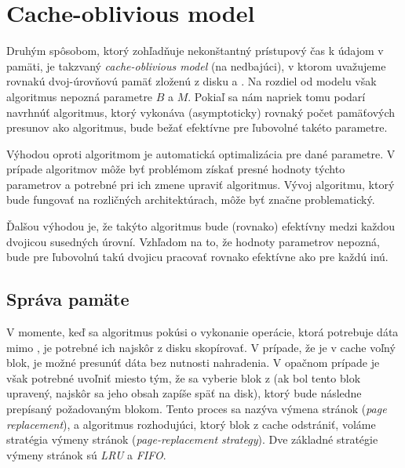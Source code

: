 \section{Cache-oblivious model}
Druhým spôsobom, ktorý zohľadňuje nekonštantný prístupový čas k údajom v pamäti, je takzvaný \emph{cache-oblivious model} (na \cache nedbajúci), v ktorom uvažujeme rovnakú dvoj-úrovňovú pamäť zloženú z disku a \cache \citep{frigo1999cache,prokop1999cache}. Na rozdiel od \aware modelu však algoritmus nepozná parametre $B$ a $M$. Pokiaľ sa nám napriek tomu podarí navrhnúť algoritmus, ktorý vykonáva (asymptoticky) rovnaký počet pamäťových presunov ako \aware algoritmus, bude bežať efektívne pre ľubovolné takéto parametre.


Výhodou oproti \aware algoritmom je automatická optimalizácia pre dané parametre. V prípade \aware algoritmov môže byť problémom získať presné hodnoty týchto parametrov a potrebné pri ich zmene upraviť algoritmus. Vývoj algoritmu, ktorý bude fungovať na rozličných architektúrach, môže byť značne problematický.

Ďalšou výhodou je, že takýto \obliv algoritmus bude (rovnako) efektívny medzi každou dvojicou susedných úrovní. Vzhľadom na to, že hodnoty parametrov nepozná, bude pre ľubovolnú takú dvojicu pracovať rovnako efektívne ako pre každú inú.


\subsection{Správa pamäte} \label{sec:memmng}
V momente, keď sa \obliv algoritmus pokúsi o vykonanie operácie, ktorá potrebuje dáta mimo \cache, je potrebné ich najskôr z disku skopírovať. V prípade, že je v cache voľný blok, je možné presunúť dáta bez nutnosti nahradenia. V opačnom prípade je však potrebné uvoľniť miesto tým, že sa vyberie blok z \cache (ak bol tento blok upravený, najskôr sa jeho obsah zapíše späť na disk), ktorý bude následne prepísaný požadovaným blokom. Tento proces sa nazýva výmena stránok ({\em page replacement}), a algoritmus rozhodujúci, ktorý blok z cache odstrániť, voláme stratégia výmeny stránok ({\em page-replacement strategy}). Dve základné stratégie výmeny stránok sú \emph{LRU} a \emph{FIFO}.


